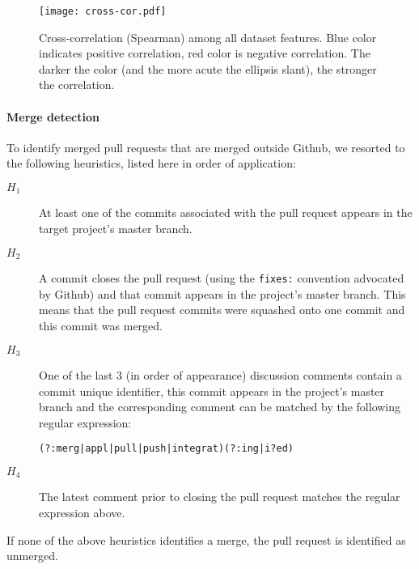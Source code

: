 \documentclass{sig-alternate}
\begin{document}
\begin{figure}
  \begin{center}
    \texttt{[image: cross-cor.pdf]}
  \end{center}
  \caption{Cross-correlation (Spearman) among all dataset features. Blue color indicates positive correlation, red color is negative correlation. The darker
  the color (and the more acute the ellipsis slant), the stronger the correlation.}
  \label{fig:features}
\end{figure}



\paragraph*{Merge detection}
To identify merged pull requests that are merged outside Github, we resorted to
the following heuristics, listed here in order of application:

\begin{description}

  \item[$H_1$] At least one of the commits associated with the pull request appears in the target project's master branch.

  \item[$H_2$] A commit closes the pull request (using the \texttt{fixes:}
    convention advocated by Github) and that commit appears in the project's
    master branch.  This means that the pull request commits were squashed onto
    one commit and this commit was merged.

  \item[$H_3$] One of the last 3 (in order of appearance) discussion comments
    contain a commit unique identifier, this commit appears in the project's
    master branch and the corresponding comment can be matched by the following
    regular expression:

    \begin{small}
    \texttt{(?:merg|appl|pull|push|integrat)(?:ing|i?ed)}
    \end{small}

  \item[$H_4$] The latest comment prior to closing the pull request matches the
    regular expression above.

\end{description}

If none of the above heuristics identifies a merge, the pull request is
identified as unmerged.
\end{document}
